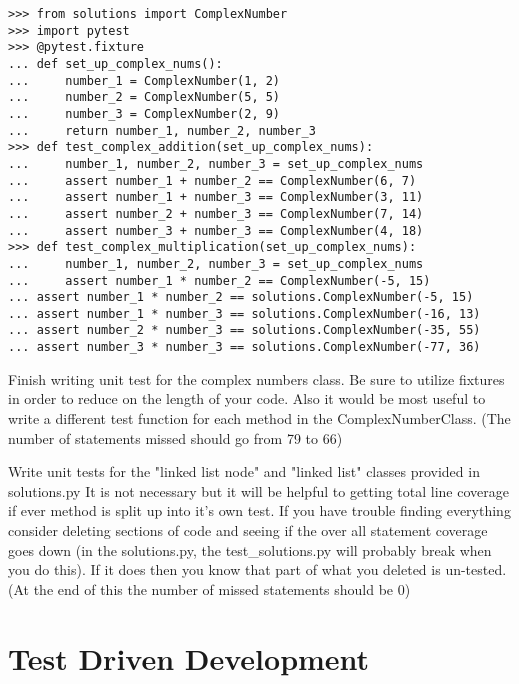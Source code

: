 \begin{lstlisting}
>>> from solutions import ComplexNumber
>>> import pytest
>>> @pytest.fixture
... def set_up_complex_nums():
...     number_1 = ComplexNumber(1, 2)
...     number_2 = ComplexNumber(5, 5)
...     number_3 = ComplexNumber(2, 9)
...     return number_1, number_2, number_3
>>> def test_complex_addition(set_up_complex_nums):
...     number_1, number_2, number_3 = set_up_complex_nums
...     assert number_1 + number_2 == ComplexNumber(6, 7)
...     assert number_1 + number_3 == ComplexNumber(3, 11)
...     assert number_2 + number_3 == ComplexNumber(7, 14)
...     assert number_3 + number_3 == ComplexNumber(4, 18)
>>> def test_complex_multiplication(set_up_complex_nums):
...     number_1, number_2, number_3 = set_up_complex_nums
...     assert number_1 * number_2 == ComplexNumber(-5, 15)
...	assert number_1 * number_2 == solutions.ComplexNumber(-5, 15)
...	assert number_1 * number_3 == solutions.ComplexNumber(-16, 13)
...	assert number_2 * number_3 == solutions.ComplexNumber(-35, 55)
...	assert number_3 * number_3 == solutions.ComplexNumber(-77, 36)

\end{lstlisting}

\begin{problem}
Finish writing unit test for the complex numbers class. Be sure to utilize fixtures in order to reduce on the length of your code.
Also it would be most useful to write a different test function for each method in the ComplexNumberClass.
(The number of statements missed should go from 79 to 66)
\end{problem}

\begin{problem}
Write unit tests for the "linked list node" and "linked list" classes provided in solutions.py It is not necessary but it will be helpful to getting total line coverage if ever method is split up into it's own test.
If you have trouble finding everything consider deleting sections of code and seeing if the over all statement coverage goes down (in the solutions.py, the test\_solutions.py will probably break when you do this).
If it does then you know that part of what you deleted is un-tested.
(At the end of this the number of missed statements should be 0)
\end{problem}

\section*{Test Driven Development}

